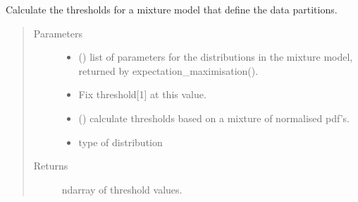 \documentclass[letterpaper,10pt,english]{sphinxmanual}
\begin{document}

\begin{fulllineitems}
\label{\detokenize{tes:tes.analysis.hard_expectation}}
\sphinxAtStartPar
Calculate the thresholds for a mixture model that define the data
partitions.
\begin{quote}\begin{description}
\item[{Parameters}] \leavevmode\begin{itemize}
\item {} 
\sphinxAtStartPar
{} () \textendash{} list of parameters for the distributions in the
mixture model, returned by expectation\_maximisation().

\item {} 
\sphinxAtStartPar
{} \textendash{} Fix threshold{[}1{]} at this value.

\item {} 
\sphinxAtStartPar
{} () \textendash{} calculate thresholds based on a mixture of
normalised pdf’s.

\item {} 
\sphinxAtStartPar
{} \textendash{} type of distribution

\end{itemize}

\item[{Returns}] \leavevmode
\sphinxAtStartPar
ndarray of threshold values.

\end{description}\end{quote}

\end{fulllineitems}

\end{document}
